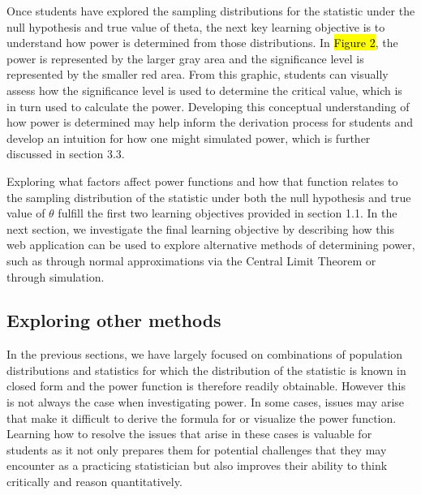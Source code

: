 \documentclass{TISE}
\begin{document}
Once students have explored the sampling distributions for the statistic under the null hypothesis and true value of theta, the next key learning objective is to understand how power is determined from those distributions. In \hl{Figure 2}, the power is represented by the larger gray area and the significance level is represented by the smaller red area. From this graphic, students can visually assess how the significance level is used to determine the critical value, which is in turn used to calculate the power. Developing this conceptual understanding of how power is determined may help inform the derivation process for students and develop an intuition for how one might simulated power, which is further discussed in section 3.3.

Exploring what factors affect power functions and how that function relates to the sampling distribution of the statistic under both the null hypothesis and true value of $\theta$ fulfill the first two learning objectives provided in section 1.1. In the next section, we investigate the final learning objective by describing how this web application can be used to explore alternative methods of determining power, such as through normal approximations via the Central Limit Theorem or through simulation.

\subsection{Exploring other methods}

In the previous sections, we have largely focused on combinations of population distributions and statistics for which the distribution of the statistic is known in closed form and the power function is therefore readily obtainable. However this is not always the case when investigating power. In some cases, issues may arise that make it difficult to derive the formula for or visualize the power function. Learning how to resolve the issues that arise in these cases is valuable for students as it not only prepares them for potential challenges that they may encounter as a practicing statistician but also improves their ability to think critically and reason quantitatively. 
\end{document}
